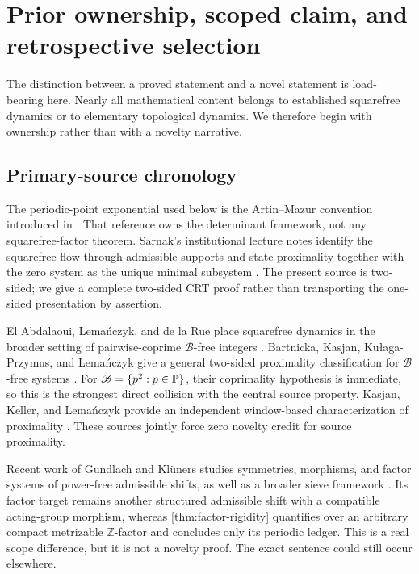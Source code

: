 \section{Prior ownership, scoped claim, and retrospective selection}
\label{sec:prior-scope}

The distinction between a proved statement and a novel statement is
load-bearing here.  Nearly all mathematical content belongs to established
squarefree dynamics or to elementary topological dynamics.  We therefore
begin with ownership rather than with a novelty narrative.

\subsection{Primary-source chronology}

The periodic-point exponential used below is the Artin--Mazur convention
introduced in \citep{artin1965periodic}.  That reference owns the determinant
framework, not any squarefree-factor theorem.  Sarnak's institutional lecture
notes identify the squarefree flow through admissible supports and state
proximality together with the zero system as the unique minimal subsystem
\citep{sarnak2011mobius}.  The present source is two-sided; we give a complete
two-sided CRT proof rather than transporting the one-sided presentation by
assertion.

El Abdalaoui, Lema\'nczyk, and de la Rue place squarefree dynamics in the
broader setting of pairwise-coprime \(\mathscr B\)-free integers
\citep{elabdalaoui2015bfree}.  Bartnicka, Kasjan,
Ku{\l}aga-Przymus, and Lema\'nczyk give a general two-sided proximality
classification for \(\mathscr B\)-free systems
\citep{bartnicka2018bfree}.  For
\(\mathscr B=\{p^2:p\in\mathbb P\}\), their coprimality hypothesis is immediate,
so this is the strongest direct collision with the central source property.
Kasjan, Keller, and Lema\'nczyk provide an independent window-based
characterization of proximality \citep{kasjan2019window}.  These sources
jointly force zero novelty credit for source proximality.

Recent work of Gundlach and Kl\"uners studies symmetries, morphisms, and
factor systems of power-free admissible shifts, as well as a broader sieve
framework \citep{gundlach2024powerfree}.  Its factor target remains another
structured admissible shift with a compatible acting-group morphism, whereas
\cref{thm:factor-rigidity} quantifies over an arbitrary compact metrizable
\(\mathbb Z\)-factor and concludes only its periodic ledger.  This is a real
scope difference, but it is not a novelty proof.  The exact sentence could
still occur elsewhere.

